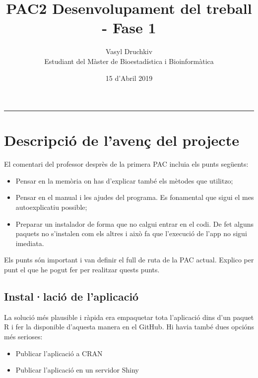 \documentclass[]{article}
\title{PAC2 Desenvolupament del treball - Fase 1}
\date{15 d'Abril 2019}
\author{Vasyl Druchkiv \\ Estudiant del Màster de Bioestadística i Bioinformàtica}
\begin{document}
\maketitle
\makeatletter

\makeatother
\begin{spacing}{0.1}
\tableofcontents
\end{spacing}

\begin{center}
\noindent\rule{8cm}{0.4pt}
\end{center}

\section{Descripció de l'avenç del projecte} 
El comentari del professor desprès de la primera PAC incluia els punts següents:

\begin{itemize}
\item Pensar en la memòria on has d'explicar també els mètodes que utilitzo;

\item Pensar en el manual i les ajudes del programa. Es fonamental que sigui el mes autoexplicatiu possible;

\item Preparar un instalador de forma que no calgui entrar en el codi. De fet alguns paquets no s'instalen com els altres i això fa que l'execució de l'app no sigui imediata.

\end{itemize}

Els punts són important i van definir el full de ruta de la PAC actual. Explico per punt el que he pogut fer  per realitzar quests punts.

 \subsection{Instal·lació de l'aplicació}

La solució més plausible i ràpida era empaquetar tota l'aplicació dins d'un paquet R i fer la disponible d'aquesta manera en el GitHub. Hi havia també dues opcións més serioses: 

\begin{itemize}
\item Publicar l'aplicació a CRAN
\item Publicar l'aplicació en un servidor Shiny
\end{itemize}
 
\end{document}
